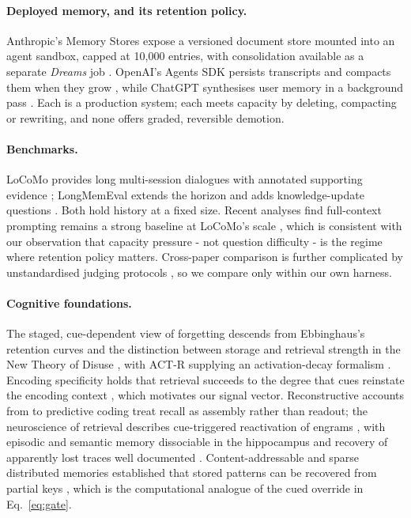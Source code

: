 \documentclass{article}
\theoremstyle{definition}\newtheorem{remark}{Remark}
\theoremstyle{plain}\newtheorem{proposition}{Proposition}
\begin{document}
\paragraph{Deployed memory, and its retention policy.} Anthropic's Memory
Stores expose a versioned document store mounted into an agent sandbox, capped
at 10{,}000 entries, with consolidation available as a separate \emph{Dreams}
job \citep{anthropic2026memory,anthropic2026dreams}. OpenAI's Agents SDK
persists transcripts and compacts them when they grow
\citep{openai2026sessions}, while ChatGPT synthesises user memory in a
background pass \citep{openai2026dreaming}. Each is a production system; each
meets capacity by deleting, compacting or rewriting, and none offers graded,
reversible demotion.

\paragraph{Benchmarks.} LoCoMo provides long multi-session dialogues with
annotated supporting evidence \citep{maharana2024locomo}; LongMemEval extends
the horizon and adds knowledge-update questions \citep{wu2025longmemeval}.
Both hold history at a fixed size. Recent analyses find full-context prompting
remains a strong baseline at LoCoMo's scale
\citep{simplebaseline2025,evallongterm2025}, which is consistent with our
observation that capacity pressure - not question difficulty - is the
regime where retention policy matters. Cross-paper comparison is further
complicated by unstandardised judging protocols \citep{mem0bench2026}, so we
compare only within our own harness.

\paragraph{Cognitive foundations.} The staged, cue-dependent view of forgetting
descends from Ebbinghaus's retention curves \citep{ebbinghaus1885} and the
distinction between storage and retrieval strength in the New Theory of Disuse
\citep{bjork1992}, with ACT-R supplying an activation-decay formalism
\citep{anderson1998actr}. Encoding specificity holds that retrieval succeeds to
the degree that cues reinstate the encoding context
\citep{tulving1983,godden1975}, which motivates our signal vector.
Reconstructive accounts from \citet{bartlett1932} to predictive coding
\citep{clark2013} treat recall as assembly rather than readout; the
neuroscience of retrieval describes cue-triggered reactivation of engrams
\citep{frankland2019retrieval,rugg2025cogneuro,rashid2016engrams}, with
episodic and semantic memory dissociable in the hippocampus
\citep{manns2003semantic} and recovery of apparently lost traces well
documented \citep{aggleton1999,proust1913}. Content-addressable and sparse
distributed memories established that stored patterns can be recovered from
partial keys \citep{hopfield1982,kanerva1988}, which is the computational
analogue of the cued override in Eq.~\eqref{eq:gate}.
\end{document}
